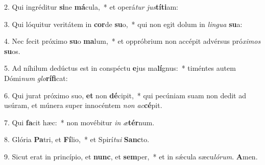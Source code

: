 2. Qui ingréditur \textbf{si}ne \textbf{má}cula,~*  et operá\textit{tur} \textit{jus}\textbf{tí}\textbf{ti}am:\

3. Qui lóquitur veritátem in \textbf{cor}de \textbf{su}o,~*  qui non egit dolum in \textit{lin}\textit{gua} \textbf{su}a:\

4. Nec fecit próximo \textbf{su}o \textbf{ma}lum,~*  et oppróbrium non accépit advérsus pró\textit{xi}\textit{mos} \textbf{su}os.\

5. Ad níhilum dedúctus est in conspéctu \textbf{e}jus ma\textbf{lí}gnus:~*  timéntes autem Dómi\textit{num} \textit{glo}\textbf{rí}\textbf{fi}cat:\

6. Qui jurat próximo suo, \textbf{et} non \textbf{dé}cipit,~*  qui pecúniam suam non dedit ad usúram, et múnera super innocéntem \textit{non} \textit{ac}\textbf{cé}pit.\

7. Qui \textbf{fa}cit hæc:~*  non movébitur \textit{in} \textit{æ}\textbf{tér}num.\

8. Glória \textbf{Pa}tri, et \textbf{Fí}lio,~*  et Spirí\textit{tu}\textit{i} \textbf{Sanc}to.\

9. Sicut erat in princípio, et \textbf{nunc}, et \textbf{sem}per,~*  et in sǽcula sæcu\textit{ló}\textit{rum}. \textbf{A}men.\

